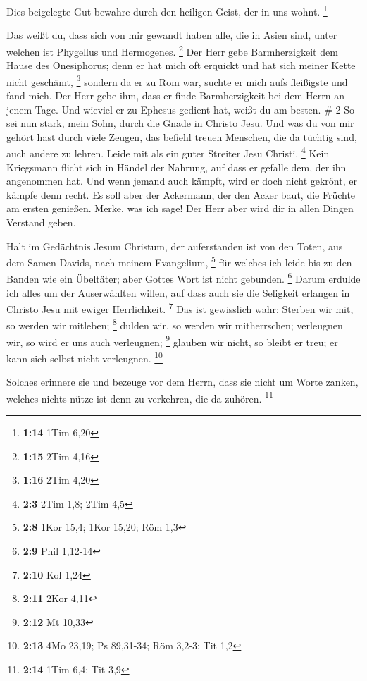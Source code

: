  Dies beigelegte Gut bewahre durch den heiligen Geist, der
in uns wohnt. \footnote{\textbf{1:14} 1Tim 6,20}

 Das weißt du, dass sich von mir gewandt haben alle, die in
Asien sind, unter welchen ist Phygellus und Hermogenes. \footnote{\textbf{1:15}
  2Tim 4,16}  Der Herr gebe Barmherzigkeit dem Hause des
Onesiphorus; denn er hat mich oft erquickt und hat sich meiner Kette
nicht geschämt, \footnote{\textbf{1:16} 2Tim 4,20}  sondern
da er zu Rom war, suchte er mich aufs fleißigste und fand mich.
 Der Herr gebe ihm, dass er finde Barmherzigkeit bei dem
Herrn an jenem Tage. Und wieviel er zu Ephesus gedient hat, weißt du am
besten. \# 2  So sei nun stark, mein Sohn, durch die Gnade
in Christo Jesu.  Und was du von mir gehört hast durch viele
Zeugen, das befiehl treuen Menschen, die da tüchtig sind, auch andere zu
lehren.  Leide mit als ein guter Streiter Jesu Christi.
\footnote{\textbf{2:3} 2Tim 1,8; 2Tim 4,5}  Kein Kriegsmann
flicht sich in Händel der Nahrung, auf dass er gefalle dem, der ihn
angenommen hat.  Und wenn jemand auch kämpft, wird er doch
nicht gekrönt, er kämpfe denn recht.  Es soll aber der
Ackermann, der den Acker baut, die Früchte am ersten genießen. Merke,
was ich sage!  Der Herr aber wird dir in allen Dingen
Verstand geben.

 Halt im Gedächtnis Jesum Christum, der auferstanden ist von
den Toten, aus dem Samen Davids, nach meinem Evangelium, \footnote{\textbf{2:8}
  1Kor 15,4; 1Kor 15,20; Röm 1,3}  für welches ich leide bis
zu den Banden wie ein Übeltäter; aber Gottes Wort ist nicht gebunden.
\footnote{\textbf{2:9} Phil 1,12-14}  Darum erdulde ich
alles um der Auserwählten willen, auf dass auch sie die Seligkeit
erlangen in Christo Jesu mit ewiger Herrlichkeit. \footnote{\textbf{2:10}
  Kol 1,24}  Das ist gewisslich wahr: Sterben wir mit, so
werden wir mitleben; \footnote{\textbf{2:11} 2Kor 4,11} 
dulden wir, so werden wir mitherrschen; verleugnen wir, so wird er uns
auch verleugnen; \footnote{\textbf{2:12} Mt 10,33}  glauben
wir nicht, so bleibt er treu; er kann sich selbst nicht verleugnen.
\footnote{\textbf{2:13} 4Mo 23,19; Ps 89,31-34; Röm 3,2-3; Tit 1,2}

 Solches erinnere sie und bezeuge vor dem Herrn, dass sie
nicht um Worte zanken, welches nichts nütze ist denn zu verkehren, die
da zuhören. \footnote{\textbf{2:14} 1Tim 6,4; Tit 3,9}

